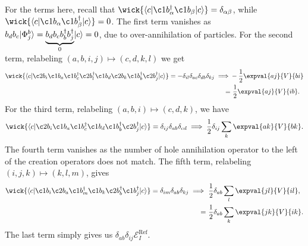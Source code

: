 For the terms here, recall that $\wick{\langle c \vert \c1 b_\alpha^\dagger \c1 b_\beta \vert c \rangle} = \delta_{\alpha \beta}$, while $\wick{\langle c \vert \c1 b_\alpha \c1 b_\beta^\dagger \vert c \rangle} = 0$.
The first term vanishes as $b_d b_c\lvert\Phi_j^{b}\rangle =  \underbrace{b_d b_c b_b^\dagger b_j^\dagger}_{0}\lvert c\rangle= 0$, due to over-annihilation of particles.
For the second term, relabeling $(a, b, i, j) \mapsto (c, d, k, l)$ we get
\begin{align*}
    \wick{
        \langle
        c \vert
        \c2 b_i
        \c1 b_a
        \c1 b_c^\dagger
        \c2 b_l^\dagger
        \c1 b_d
        \c2 b_k
        \c1 b_b^\dagger
        \c2 b_j^\dagger
        \vert c
        \rangle
    } = -\delta_{il} \delta_{ac} \delta_{db} \delta_{kj} \implies&
    -\frac{1}{2} \expval{a j}{V}{b i} \\
    =& \ \frac{1}{2} \expval{aj}{V}{ib}.
\end{align*}
For the third term, relabeling $(a, b, i) \mapsto (c, d, k)$, we have
\begin{equation*}
    \wick{
        \langle
        c \vert
        \c2 b_i
        \c1 b_a
        \c1 b_c^\dagger
        \c1 b_d
        \c1 b_b^\dagger
        \c2 b_j^\dagger
        \vert c
        \rangle
    } = \delta_{ij} \delta_{ab} \delta_{cd} \implies
    \frac{1}{2} \delta_{ij} \sum_{k} \expval{a k}{V}{b k}.
\end{equation*}
The fourth term vanishes as the number of hole annihilation operator to the left of the creation operators does not match.
The fifth term, relabeling $(i, j, k) \mapsto (k, l, m)$, gives
\begin{align*}
    \wick{
        \langle
        c \vert
        \c1 b_i
        \c2 b_a
        \c1 b_m^\dagger
        \c1 b_k
        \c2 b_b^\dagger
        \c1 b_j^\dagger
        \vert c
        \rangle
    } = \delta_{im} \delta_{ab} \delta_{kj}
    \implies& \
    \frac{1}{2} \delta_{ab} \sum_{l} \expval{j l}{V}{i l}, \\
    =& \ \frac{1}{2} \delta_{ab} \sum_{k} \expval{j k}{V}{i k}.
\end{align*}
The last term simply gives us $\delta_{ab} \delta_{ij} \mathcal{E}_I^{\text{Ref}}$.

